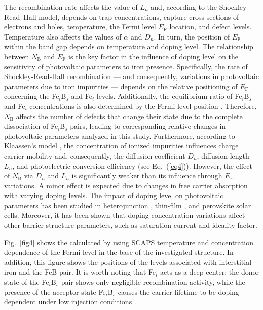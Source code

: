 \documentclass[a4paper,fleqn]{cas-sc}
\begin{document}
The recombination rate affects the value of $L_n$ and, according to the Shockley--Read--Hall model,
depends on trap concentrations, capture cross-sections of electrons and holes, temperature, the Fermi level $E_\mathrm{F}$ location, and defect levels.
Temperature also affects the values of $\alpha$ and $D_n$.
In turn, the position of $E_\mathrm{F}$ within the band gap depends on temperature and doping level.
The relationship between $N_\mathrm{B}$ and $E_\mathrm{F}$ is the key  factor
in the influence of doping level on the sensitivity of photovoltaic parameters to iron presence.
Specifically, the rate of Shockley-Read-Hall recombination ---
and consequently, variations in photovoltaic parameters due to iron impurities ---
depends on the relative positioning of $E_\mathrm{F}$ concerning the Fe$_i$B$_s$ and Fe$_i$ levels.
Additionally, the equilibrium ratio of Fe$_i$B$_s$ and Fe$_i$ concentrations is also determined by the Fermi level position \cite{FeB:kinetic,MurphyJAP2011}.
Therefore, $N_\mathrm{B}$ affects the number of defects that change their state due to the complete dissociation of Fe$_i$B$_s$ pairs,
leading to corresponding relative changes in photovoltaic parameters analyzed in this study.
Furthermore, according to Klaassen’s model \cite{KLAASSEN953},
the concentration of ionized impurities influences charge carrier mobility and, consequently, the diffusion coefficient $D_n$, diffusion length $L_n$,
and photoelectric conversion efficiency (see Eq.~(\ref{eq4})).
However, the effect of $N_\mathrm{B}$ via $D_n$ and $L_n$ is significantly weaker than its influence through $E_\mathrm{F}$ variations.
A minor effect is expected due to changes in free carrier absorption with varying doping levels.
The impact of doping level on photovoltaic parameters has been studied in heterojunction \cite{Sultana2024},
thin-film \cite{Akila2024},
and perovskite \cite{MasumMia2025} solar cells.
Moreover, it has been shown \cite{Akila2024} that
doping concentration variations affect other barrier structure parameters, such as saturation current and ideality factor.

Fig.~\ref{fig4} shows the calculated by using SCAPS temperature and concentration dependence of the Fermi level in the base of the investigated structure.
In addition, this figure shows the positions of the levels associated with interstitial iron and the FeB pair.
It is worth noting that Fe$_i$ acts as a deep center;
the donor state of the Fe$_i$B$_s$ pair shows only negligible recombination activity,
while the presence of the acceptor state Fe$_i$B$_s$ causes the
carrier lifetime to be doping-dependent under low injection conditions \cite{FeB:Schmidt}.
\end{document}
